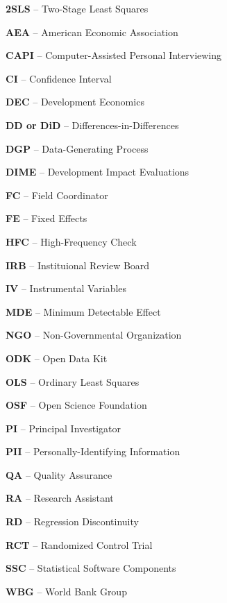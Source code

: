 \noindent\textbf{2SLS} -- Two-Stage Least Squares

\noindent\textbf{AEA} -- American Economic Association

\noindent\textbf{CAPI} -- Computer-Assisted Personal Interviewing

\noindent\textbf{CI} -- Confidence Interval

\noindent\textbf{DEC} -- Development Economics

\noindent\textbf{DD or DiD} -- Differences-in-Differences

\noindent\textbf{DGP} -- Data-Generating Process

\noindent\textbf{DIME} -- Development Impact Evaluations

\noindent\textbf{FC} -- Field Coordinator

\noindent\textbf{FE} -- Fixed Effects

\noindent\textbf{HFC} -- High-Frequency Check

\noindent\textbf{IRB} -- Instituional Review Board

\noindent\textbf{IV} -- Instrumental Variables

\noindent\textbf{MDE} -- Minimum Detectable Effect

\noindent\textbf{NGO} -- Non-Governmental Organization

\noindent\textbf{ODK} -- Open Data Kit

\noindent\textbf{OLS} -- Ordinary Least Squares

\noindent\textbf{OSF} -- Open Science Foundation

\noindent\textbf{PI} -- Principal Investigator

\noindent\textbf{PII} -- Personally-Identifying Information

\noindent\textbf{QA} -- Quality Assurance

\noindent\textbf{RA} -- Research Assistant

\noindent\textbf{RD} -- Regression Discontinuity

\noindent\textbf{RCT} -- Randomized Control Trial

\noindent\textbf{SSC} -- Statistical Software Components

\noindent\textbf{WBG} -- World Bank Group
